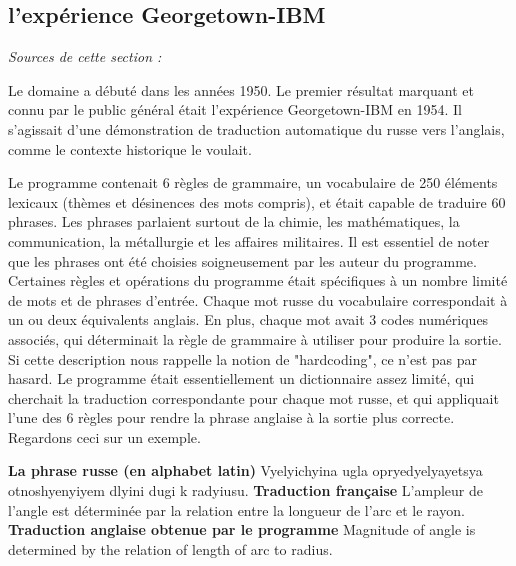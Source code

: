 \documentclass[11pt, a4paper]{report}
\begin{document}
    \subsection{l'expérience Georgetown-IBM}
    \textit{Sources de cette section : } \newline
    \noindent \cite[Natural Language Processing (Wikipédia)]{wikipedia-nlp} \newline
    \cite[Georgetown-IBM experiment (Wikipédia)]{wikipedia-georgetown} \newline 
    \cite[The first public demonstration of machine translation...]{hutchins-georgetown}

Le domaine a débuté dans les années 1950. Le premier résultat 
marquant et connu par le public général était l'expérience Georgetown-IBM en 1954. Il s'agissait d'une 
démonstration de traduction automatique du russe vers l'anglais, comme le 
contexte historique le voulait.

Le programme contenait 6 règles de grammaire, un vocabulaire de 250 éléments lexicaux 
(thèmes et désinences des mots compris), et était capable de traduire 60 
phrases. Les phrases parlaient surtout de la chimie, les mathématiques, la 
communication, la métallurgie et les affaires militaires. Il est essentiel de 
noter que les phrases ont été choisies soigneusement par les auteur du programme. 
Certaines règles et opérations du programme était spécifiques à un nombre limité 
de mots et de phrases d'entrée. Chaque mot russe du vocabulaire correspondait à un ou deux 
équivalents anglais. En plus, chaque mot avait 3 codes numériques associés, qui 
déterminait la règle de grammaire à utiliser pour produire la sortie. 
Si cette description nous rappelle la notion de 
"hardcoding", ce n'est pas par hasard. Le programme était essentiellement un 
dictionnaire assez limité, qui cherchait la traduction correspondante pour chaque 
mot russe, et qui appliquait l'une des 6 règles pour rendre la phrase anglaise 
à la sortie plus correcte. Regardons ceci sur un exemple. 


\noindent \textbf{La phrase russe (en alphabet latin)} \newline 
Vyelyichyina ugla opryedyelyayetsya otnoshyenyiyem dlyini dugi k radyiusu. \newline  
\textbf{Traduction française} \newline 
L'ampleur de l'angle est déterminée par la relation entre la longueur de l'arc et le rayon. \newline 
\textbf{Traduction anglaise obtenue par le programme} \newline 
Magnitude of angle is determined by the relation of length of arc to radius.
\end{document}
